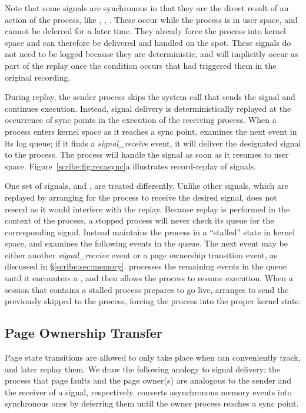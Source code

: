 Note that some signals are synchronous in that they are the direct
result of an action of the process, like ,
, .  These occur while the process is in
user space, and cannot be deferred for a later time.  They already
force the process into kernel space and can therefore be delivered and
handled on the spot.  These signals do not need to be logged because
they are deterministic, and will implicitly occur as part of the
replay once the condition occurs that had triggered them in the
original recording.

During replay, the sender process skips the system call that
sends the signal and continues execution. Instead, signal
delivery is deterministically replayed at the occurrence of sync
points in the execution of the receiving process. When
a process enters kernel space as it reaches a sync point, \scribe{}
examines the next event in its log queue; if it finds a
{\em signal\_receive} event, it will
deliver the designated signal to the process. The process will
handle the signal as soon as it resumes to user space.
Figure~\ref{scribe:fig:recasync}a illustrates record-replay of signals.

One set of signals,  and , are treated
differently.  Unlike other signals, which are replayed by arranging
for the process to receive the desired signal, \scribe{} does not
resend  as it would interfere with the replay. Because
replay is performed in the context of the process, a stopped process
will never check its queue for the corresponding
 signal. Instead \scribe{} maintains the process in a
``stalled'' state in kernel space, and examines the following events in
the queue. The next event may be either another {\em signal\_receive}
event or a page ownership transition event, as discussed in
\S\ref{scribe:sec:memory}. \scribe{} 
processes the remaining events in the queue
until it encounters a , and then allows the process to
resume execution.  When a session that contains a stalled process
prepares to go live, \scribe{} arranges to send the previously
skipped  to the process, forcing the process into the
proper kernel state.

  

\subsection{Page Ownership Transfer}

Page state transitions are allowed to only take place when \scribe{}
can conveniently track, and later replay them. We draw the following
analogy to signal delivery: the process that page faults and the page
owner(s) are analogous to the sender and the receiver of a signal,
respectively.  \scribe{} converts asynchronous memory events into
synchronous ones by deferring them until the owner process reaches a
sync point.

